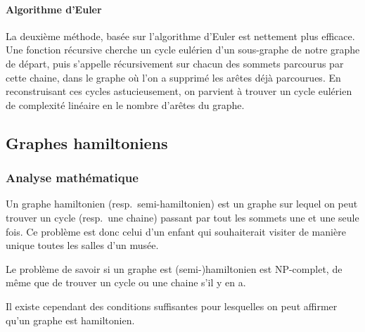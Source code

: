     \paragraph{Algorithme d'Euler}
      La deuxième méthode, basée sur l'algorithme d'Euler est nettement plus
      efficace. Une fonction récursive cherche un cycle eulérien d'un
      sous-graphe de notre graphe de départ, puis s'appelle récursivement sur
      chacun des sommets parcourus par cette chaine, dans le graphe où l'on a
      supprimé les arêtes déjà parcourues. En reconstruisant ces cycles
      astucieusement, on parvient à trouver un cycle eulérien de complexité
      linéaire en le nombre d'arêtes du graphe.

\subsection{Graphes hamiltoniens}
  \subsubsection{Analyse mathématique}
    Un graphe hamiltonien (resp.\ semi-hamiltonien) est un graphe sur lequel on
    peut trouver un cycle (resp.\ une chaine) passant par tout les sommets une
    et une seule fois. Ce problème est donc celui d'un enfant qui souhaiterait
    visiter de manière unique toutes les salles d'un musée.

    Le problème de savoir si un graphe est (semi-)hamiltonien est NP-complet,
    de même que de trouver un cycle ou une chaine s'il y en a.

    Il existe cependant des conditions suffisantes pour lesquelles on peut
    affirmer qu'un graphe est hamiltonien.

